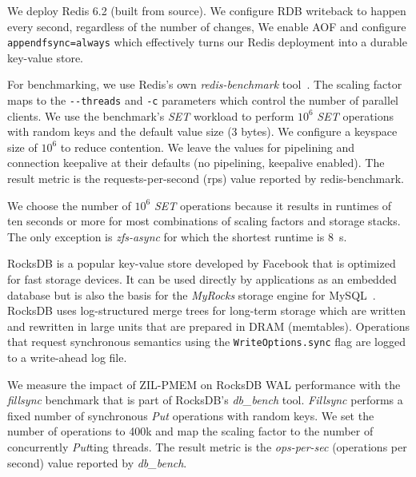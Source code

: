 \documentclass[12pt,a4paper,twoside]{book}
\begin{document}
{\begin{description}[noitemsep,leftmargin=1.5cm,labelindent=1cm]
        We deploy Redis 6.2 (built from source).
        We configure RDB writeback to happen every second, regardless of the number of changes,
        We enable AOF and configure \lstinline{appendfsync=always} which effectively turns our Redis deployment into a durable key-value store.

        For benchmarking, we use Redis's own \textit{redis-benchmark} tool~\cite{HowFastRedis}.
        The scaling factor maps to the \lstinline{--threads} and \lstinline{-c} parameters which control the number of parallel clients.
        We use the benchmark's \textit{SET} workload to perform $10^6$ \textit{SET} operations with random keys and the default value size (3 bytes).
        We configure a keyspace size of $10^6$  to reduce contention.
        We leave the values for pipelining and connection keepalive at their defaults (no pipelining, keepalive enabled).
        The result metric is the requests-per-second (rps) value reported by redis-benchmark.

        We choose the number of $10^6$ \textit{SET} operations because it results in runtimes of ten seconds or more for most combinations of scaling factors and storage stacks.
        The only exception is \textit{zfs-async} for which the shortest runtime is 8~s.

    \item[RocksDB-fillsync] RocksDB is a popular key-value store developed by Facebook that is optimized for fast storage devices.
        It can be used directly by applications as an embedded database but is also the basis for the \textit{MyRocks} storage engine for MySQL~\cite{MyRocksRocksDBStorage}.
        RocksDB uses log-structured merge trees for long-term storage which are written and rewritten in large units that are prepared in DRAM (memtables).
        Operations that request synchronous semantics using the \lstinline{WriteOptions.sync} flag are logged to a write-ahead log file.~\cite{FlushWALLessFwrite,RocksDBGitHubWikiWalPerformance}

        We measure the impact of ZIL-PMEM on RocksDB WAL performance with the \textit{fillsync} benchmark that is part of RocksDB's \textit{db\_bench} tool.
        \textit{Fillsync} performs a fixed number of synchronous \textit{Put} operations with random keys.
        We set the number of operations to 400k and map the scaling factor to the number of concurrently \textit{Put}ting threads.
        The result metric is the \textit{ops-per-sec} (operations per second) value reported by \textit{db\_bench}.


\end{description}}
\end{document}

